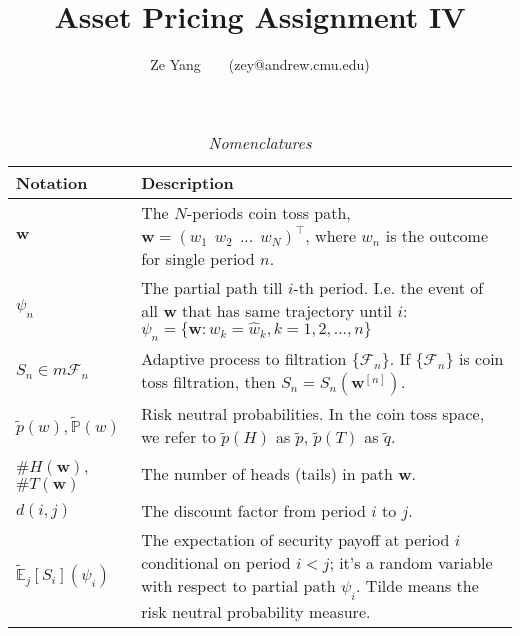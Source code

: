 \documentclass[a4paper, 10pt]{article}
\title{\textbf{Asset Pricing Assignment IV}}
\author{Ze Yang~~~~(zey@andrew.cmu.edu)}
\renewcommand{\arraystretch}{1.4}
\theoremstyle{definition}
\theoremstyle{hSol}
\begin{document}
\maketitle

\begin{table}[h]
\vspace{-10pt}
\caption{\textit{Nomenclatures}}
\vspace{3pt}
\centering
\def\arraystretch{1.15}
\begin{tabular}{lL}
\hline
Notation & \hspace{4.6cm} Description \\ 
\hline
$\bm{w}$ & The $N$-periods coin toss path, $\bm{w} = (w_1~~w_2~~...~~w_N)^{\top}$, where $w_n$ is the outcome for single period $n$.\\
$\psi_n$ & The partial path till $i$-th period. I.e. the event of all $\bm{w}$ that has same trajectory until $i$: $\psi_n=\{\bm{w}: w_k=\hat{w}_k, k =1,2,...,n\}$\\
$S_n \in m \mathcal{F}_n$ & Adaptive process to filtration $\{\mathcal{F}_n\}$. If $\{\mathcal{F}_n\}$ is coin toss filtration, then $S_n = S_n(\bm{w}^{[n]})$.\\
$\tilde{p}(w), \tilde{\mathbb{P}}\left(w\right)$ & Risk neutral probabilities. In the coin toss space, we refer to $\tilde{p}(H)$ as $\tilde{p}$, $\tilde{p}(T)$ as $\tilde{q}$.\\
$\#H(\bm{w})$, $\#T(\bm{w})$ & The number of heads (tails) in path $\bm{w}$. \\
$d(i, j)$ & The discount factor from period $i$ to $j$. \\
$\tilde{\mathbb{E}}_j\left[S_{i}\right](\psi_i)$ & The expectation of security payoff at period $i$ conditional on period $i<j$; it's a random variable with respect to partial path $\psi_i$. Tilde means the risk neutral probability measure.\\
\hline 
\end{tabular}
\label{tab:Nomen}
\end{table}
\end{document}
